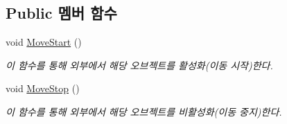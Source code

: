 \subsection*{Public 멤버 함수}
\begin{DoxyCompactItemize}
\item 
void \mbox{\hyperlink{class_moving_platform_a2e7148eddf9ada2373e3507c02146896}{Move\+Start}} ()
\begin{DoxyCompactList}\small\item\em 이 함수를 통해 외부에서 해당 오브젝트를 활성화(이동 시작)한다. \end{DoxyCompactList}\item 
void \mbox{\hyperlink{class_moving_platform_a9150bceccb63034907ab3ec46216ae83}{Move\+Stop}} ()
\begin{DoxyCompactList}\small\item\em 이 함수를 통해 외부에서 해당 오브젝트를 비활성화(이동 중지)한다. \end{DoxyCompactList}\end{DoxyCompactItemize}
